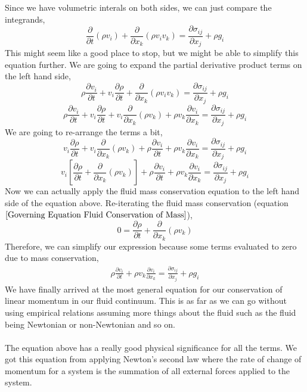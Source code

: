 Since we have volumetric interals on both sides, we can just compare the integrands,
$$ \frac{\partial }{\partial t}(\rho v_{i}) + \frac{\partial}{\partial x_{k}} (\rho v_{i} v_{k}) = \frac{\partial \sigma_{ij}}{\partial x_{j}}  +  \rho g_{i} $$
This might seem like a good place to stop, but we might be able to simplify this equation further. 
We are going to expand the partial derivative product terms on the left hand side,
$$ \rho\frac{\partial v_{i}}{\partial t} + v_{i}\frac{\partial \rho}{\partial t} + \frac{\partial}{\partial x_{k}} (\rho v_{i} v_{k}) = \frac{\partial \sigma_{ij}}{\partial x_{j}}  +  \rho g_{i} $$
$$ \rho\frac{\partial v_{i}}{\partial t} + v_{i}\frac{\partial \rho}{\partial t} + v_{i}\frac{\partial}{\partial x_{k}} (\rho v_{k}) + \rho v_{k}\frac{\partial v_{i}}{\partial x_{k}} = \frac{\partial \sigma_{ij}}{\partial x_{j}}  +  \rho g_{i} $$
We are going to re-arrange the terms a bit,
$$v_{i}\frac{\partial \rho}{\partial t} + v_{i}\frac{\partial}{\partial x_{k}} (\rho v_{k}) + \rho\frac{\partial v_{i}}{\partial t} + \rho v_{k}\frac{\partial v_{i}}{\partial x_{k}} = \frac{\partial \sigma_{ij}}{\partial x_{j}}  +  \rho g_{i} $$
$$v_{i}\left[\frac{\partial \rho}{\partial t} + \frac{\partial}{\partial x_{k}} (\rho v_{k})\right] + \rho\frac{\partial v_{i}}{\partial t} + \rho v_{k}\frac{\partial v_{i}}{\partial x_{k}} = \frac{\partial \sigma_{ij}}{\partial x_{j}}  +  \rho g_{i} $$
Now we can actually apply the fluid mass conservation equation to the left hand side of the equation above.
Re-iterating the fluid mass conservation (equation $\ref{Governing Equation Fluid Conservation of Mass}$),
$$0 = \frac{\partial \rho}{\partial t} + \frac{\partial}{\partial x_{k}} (\rho v_{k}) $$
Therefore, we can simplify our expression because some terms evaluated to zero due to mass conservation,
\begin{eqnarray}
\rho\frac{\partial v_{i}}{\partial t} + \rho v_{k}\frac{\partial v_{i}}{\partial x_{k}} = \frac{\partial \sigma_{ij}}{\partial x_{j}}  +  \rho g_{i} 
\label{Conservation of Momentum Fluid General}
\end{eqnarray}
We have finally arrived at the most general equation for our conservation of linear momentum in our fluid continuum.
This is as far as we can go without using empirical relations assuming more things about the fluid such as the fluid being Newtonian or non-Newtonian and so on.
\\~\\The equation above has a really good physical significance for all the terms. 
We got this equation from applying Newton's second law where the rate of change of momentum for a system is the summation of all external forces applied to the system.
